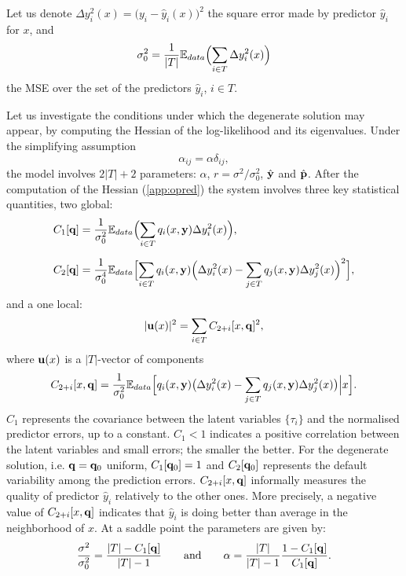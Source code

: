 Let us denote $\Delta y_i^2(x)= \bigl(y_i-\hat y_i(x)\bigr)^2$ the square error made by predictor 
$\hat y_i$ for $x$, and 
\[
  \sigma_0^2 = \frac{1}{|T|}{\mathbb E}_{data}\Bigl(\sum_{i \in T } \Delta y_i^2(x)\Bigr)
\]
the MSE over the set of the predictors $\hat y_i$, $i \in T$. 

Let us investigate the conditions under which the degenerate solution may appear, by computing the 
Hessian of the log-likelihood and its eigenvalues. Under the simplifying assumption
\[
  \alpha_{ij} = \alpha \delta_{ij},
\]
the model involves $2\vert T\vert+2$ parameters: $\alpha$, $r = \sigma^2/\sigma_0^2$, 
$\hat {\bf y}$ and $\hat{\bf p}$. After the computation of the Hessian (\cref{app:opred}) the system 
involves three key statistical quantities, two global:
%
\begin{align}
  C_1[{\bf q}] &= \frac{1}{\sigma_0^2}{
    \mathbb E}_{data}
      \Bigl(
        \sum_{i \in T} q_i(x,{\bf y})\Delta y_i^2(x)
      \Bigr), \label{def:C1}\\[0.2cm]
  C_2[{\bf q}] &= \frac{1}{\sigma_0^4} {\mathbb E}_{data} 
    \Bigl[\sum_{i\in T}q_i(x,{\bf y})
      \Bigl(
        \Delta y_i^2(x)-\sum_{j \in T} q_j(x,{\bf y})\Delta y_j^2(x)
      \Bigr)^2
    \Bigr],\label{def:C2}
\end{align}
%
and a one local:
\begin{equation}
  \vert {\bf u}(x)\vert^2 = \sum_{i\in T} C_{2+i}[x,{\bf q}]^2,
\end{equation}
%
where ${\bf u}(x)$ is a $\vert T\vert$-vector of components 
%
\[
  C_{2+i}[x,{\bf q}] = \frac{1}{\sigma_0^2}{\mathbb E}_{data}
    \Bigl[ q_i(x,{\bf y})
      \bigl(
        \Delta y_i^2(x)-\sum_{j \in T} q_j(x,{\bf y})\Delta y_j^2(x)
      \bigr)\Big\vert x 
    \Bigr].
\]
%
$C_1$ represents the covariance between the latent variables $\{\tau_i\}$ and the normalised 
predictor errors, up to a constant. $C_1 < 1$ indicates a positive correlation between the latent 
variables and small errors; the smaller the better. For the degenerate solution, i.e. 
${\bf q}={\bf q}_{0}$ uniform, $C_1[{\bf q}_{0}]=1$ and $C_2[{\bf q}_{0}]$ represents the default variability among the 
prediction errors. $C_{2+i}[x,{\bf q}]$ informally measures the quality of predictor $\hat y_i$ 
relatively to the other ones. More precisely, a negative value of  $C_{2+i}[x,{\bf q}]$ indicates 
that $\hat y_i$ is doing better than average in the neighborhood of $x$.  
%
At a saddle point the parameters are given by:
%
\[
  \frac{\sigma^2}{\sigma_0^2} = 
    \frac{\vert T\vert-C_1[{\bf q}]}{\vert T\vert-1} 
    \qquad\text{and}\qquad
    \alpha = \frac{\vert T\vert}{\vert T\vert-1}\frac{1-C_1[{\bf q}]}{C_1[{\bf q}]}.
\]
